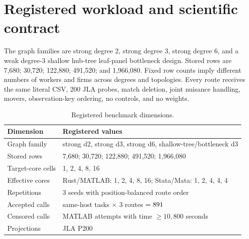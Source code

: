 \documentclass[11pt]{article}
\begin{document}
\section{Registered workload and scientific contract}

The graph families are strong degree 2, strong degree 3, strong degree 6, and
a weak degree-3 shallow hub-tree leaf-panel bottleneck design. Stored rows are
7,680; 30,720; 122,880; 491,520; and 1,966,080. Fixed row counts imply
different numbers of workers and firms across degrees and topologies. Every
route receives the same literal CSV,
200 JLA probes, match deletion, joint nuisance handling, movers, observation-key
ordering, no controls, and no weights.

\begin{table}[ht]
\centering
\caption{Registered benchmark dimensions.}
\begin{tabular}{ll}
\toprule
Dimension & Registered values \\
\midrule
Graph family & strong d2, strong d3, strong d6, shallow-tree/bottleneck d3 \\
Stored rows & 7,680; 30,720; 122,880; 491,520; 1,966,080 \\
Target-core cells & 1, 2, 4, 8, 16 \\
Effective cores & Rust/MATLAB: 1, 2, 4, 8, 16; Stata/Mata: 1, 2, 4, 4, 4 \\
Repetitions & 3 seeds with position-balanced route order \\
Accepted calls & \ValidatedTasks{} same-host tasks $\times$ 3 routes $=891{}$ \\
Censored calls & \CensoredMatlab{} MATLAB attempts with time $\geq 10{,}800$ seconds \\
Projections & JLA P200 \\
\bottomrule
\end{tabular}
\end{table}
\end{document}
